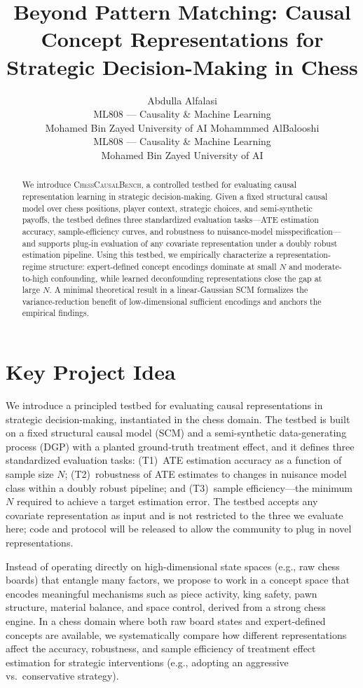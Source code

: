\documentclass{article}
\title{Beyond Pattern Matching: Causal Concept Representations for Strategic Decision-Making in Chess}
\author{%
  Abdulla Alfalasi \\
  ML808 --- Causality \& Machine Learning \\
  Mohamed Bin Zayed University of AI
  \And
  Mohammmed AlBalooshi \\
  ML808 --- Causality \& Machine Learning \\
  Mohamed Bin Zayed University of AI
}
\begin{document}
\maketitle

\begin{abstract}

We introduce \textsc{ChessCausalBench}, a controlled testbed for evaluating causal
representation learning in strategic decision-making. Given a fixed structural causal
model over chess positions, player context, strategic choices, and semi-synthetic
payoffs, the testbed defines three standardized evaluation tasks---ATE estimation
accuracy, sample-efficiency curves, and robustness to nuisance-model
misspecification---and supports plug-in evaluation of any covariate representation
under a doubly robust estimation pipeline. Using this testbed, we empirically
characterize a representation-regime structure: expert-defined concept encodings
dominate at small $N$ and moderate-to-high confounding, while learned deconfounding
representations close the gap at large $N$. A minimal theoretical result in a
linear-Gaussian SCM formalizes the variance-reduction benefit of low-dimensional
sufficient encodings and anchors the empirical findings.
\end{abstract}

\section{Key Project Idea}

We introduce a principled testbed for evaluating causal representations in
strategic decision-making, instantiated in the chess domain. The testbed is built
on a fixed structural causal model (SCM) and a semi-synthetic data-generating
process (DGP) with a planted ground-truth treatment effect, and it defines three
standardized evaluation tasks: (T1)~ATE estimation accuracy as a function of sample
size $N$; (T2)~robustness of ATE estimates to changes in nuisance model class within
a doubly robust pipeline; and (T3)~sample efficiency---the minimum $N$ required to
achieve a target estimation error. The testbed accepts any covariate representation
as input and is not restricted to the three we evaluate here; code and protocol will
be released to allow the community to plug in novel representations.\cite{scholkopf2021towards,pearl2009causality}

Instead of operating directly on high-dimensional state spaces (e.g., raw chess
boards) that entangle many factors, we propose to work in a concept space that
encodes meaningful mechanisms such as piece activity, king safety, pawn structure,
material balance, and space control, derived from a strong chess engine.\cite{lemeire2005causalmodelsinchess,stockfish}
In a chess domain where both raw board states and expert-defined concepts are
available, we systematically compare how different representations affect the
accuracy, robustness, and sample efficiency of treatment effect estimation for
strategic interventions (e.g., adopting an aggressive vs.\ conservative
strategy).\cite{chernozhukov2018double,scholkopf2021towards}
\end{document}
